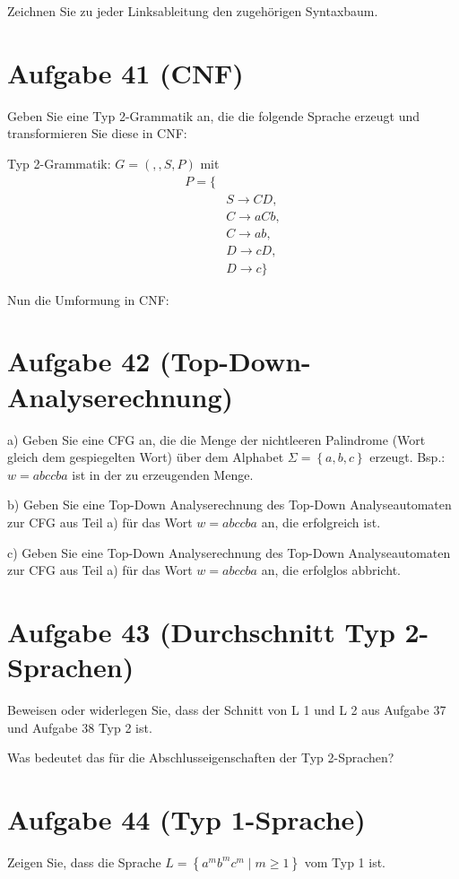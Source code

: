 \documentclass{article}
\begin{document}
Zeichnen Sie zu jeder Linksableitung den zugehörigen Syntaxbaum.


\section*{Aufgabe 41 (CNF)}

Geben Sie eine Typ 2-Grammatik an, die die folgende Sprache erzeugt und transformieren Sie
diese in CNF:

Typ 2-Grammatik:
$G = ({}, {}, S, P)$ mit
\begin{equation}
\begin{split}
P = \{ \\\
&S \rightarrow CD, \\\
&C \rightarrow aCb, \\\
&C \rightarrow ab, \\\
&D \rightarrow cD, \\\
&D \rightarrow c \}
\end{split}
\end{equation}

Nun die Umformung in CNF:


\section*{Aufgabe 42 (Top-Down-Analyserechnung)}

a) Geben Sie eine CFG an, die die Menge der nichtleeren Palindrome (Wort gleich dem gespiegelten Wort) über dem Alphabet $\Sigma = \left\{a, b, c\right\}$ erzeugt. Bsp.: $w=abccba$ ist in der zu erzeugenden Menge.

b) Geben Sie eine Top-Down Analyserechnung des Top-Down Analyseautomaten zur CFG aus Teil a) für das Wort $w=abccba$ an, die erfolgreich ist.

c) Geben Sie eine Top-Down Analyserechnung des Top-Down Analyseautomaten zur CFG aus Teil a) für das Wort $w=abccba$ an, die erfolglos abbricht.


\section*{Aufgabe 43 (Durchschnitt Typ 2-Sprachen)}

Beweisen oder widerlegen Sie, dass der Schnitt von L 1 und L 2 aus Aufgabe 37 und Aufgabe 38 Typ 2 ist.


Was bedeutet das für die Abschlusseigenschaften der Typ 2-Sprachen?


\section*{Aufgabe 44 (Typ 1-Sprache)}

Zeigen Sie, dass die Sprache $L = \left\{a^m b^m c^m \mid m \geq 1\right\}$ vom Typ 1 ist.
\end{document}
